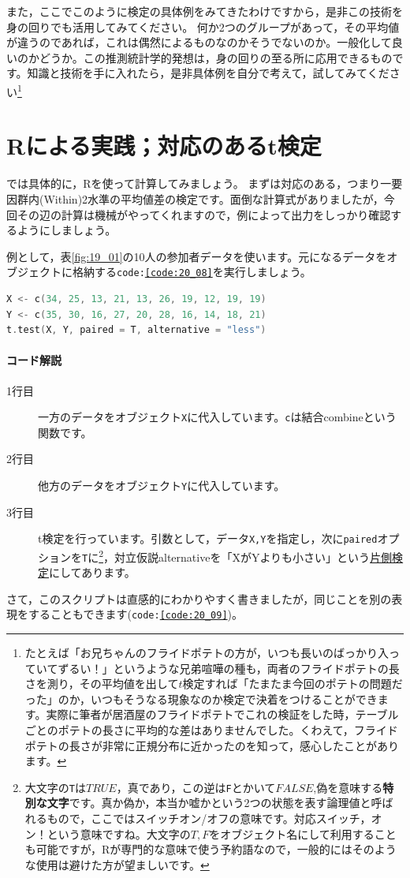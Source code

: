 \documentclass{ltjsbook}
\begin{document}
また，ここでこのように検定の具体例をみてきたわけですから，是非この技術を身の回りでも活用してみてください。
何か2つのグループがあって，その平均値が違うのであれば，これは偶然によるものなのかそうでないのか。一般化して良いのかどうか。この推測統計学的発想は，身の回りの至る所に応用できるものです。知識と技術を手に入れたら，是非具体例を自分で考えて，試してみてください\footnote{たとえば「お兄ちゃんのフライドポテトの方が，いつも長いのばっかり入っていてずるい！」というような兄弟喧嘩の種も，両者のフライドポテトの長さを測り，その平均値を出して$t$検定すれば「たまたま今回のポテトの問題だった」のか，いつもそうなる現象なのか検定で決着をつけることができます。実際に筆者が居酒屋のフライドポテトでこれの検証をした時，テーブルごとのポテトの長さに平均的な差はありませんでした。くわえて，フライドポテトの長さが非常に正規分布に近かったのを知って，感心したことがあります。}


\section{Rによる実践；対応のあるt検定}
では具体的に，Rを使って計算してみましょう。
まずは対応のある，つまり一要因群内(Within)2水準の平均値差の検定です。面倒な計算式がありましたが，今回その辺の計算は機械がやってくれますので，例によって出力をしっかり確認するようにしましょう。

例として，表\ref{fig:19_01}の10人の参加者データを使います。元になるデータをオブジェクトに格納する\texttt{code:\ref{code:20_08}}を実行しましょう。
\begin{lstlisting}[language=c++,label={code:20_08},caption={t検定を行う}]
X <- c(34, 25, 13, 21, 13, 26, 19, 12, 19, 19)
Y <- c(35, 30, 16, 27, 20, 28, 16, 14, 18, 21)
t.test(X, Y, paired = T, alternative = "less")
\end{lstlisting}

\paragraph{コード解説}
\begin{description}
	\item[1行目] 一方のデータをオブジェクト\texttt{X}に代入しています。\texttt{c}は結合combineという関数です。
	\item[2行目] 他方のデータをオブジェクト\texttt{Y}に代入しています。
	\item[3行目] t検定を行っています。引数として，データ\texttt{X,Y}を指定し，次に\texttt{paired}オプションを\texttt{T}に\footnote{大文字の\texttt{T}は$TRUE$，真であり，この逆は\texttt{F}とかいて$FALSE$,偽を意味する\textbf{特別な文字}です。真か偽か，本当か嘘かという2つの状態を表す論理値と呼ばれるもので，ここではスイッチオン/オフの意味です。対応スイッチ，オン！という意味ですね。大文字の$T,F$をオブジェクト名にして利用することも可能ですが，Rが専門的な意味で使う予約語なので，一般的にはそのような使用は避けた方が望ましいです。}，対立仮説alternativeを「XがYよりも小さい」という\underline{片側検定}にしてあります。
\end{description}
さて，このスクリプトは直感的にわかりやすく書きましたが，同じことを別の表現をすることもできます(\texttt{code:\ref{code:20_09}})。
\end{document}

